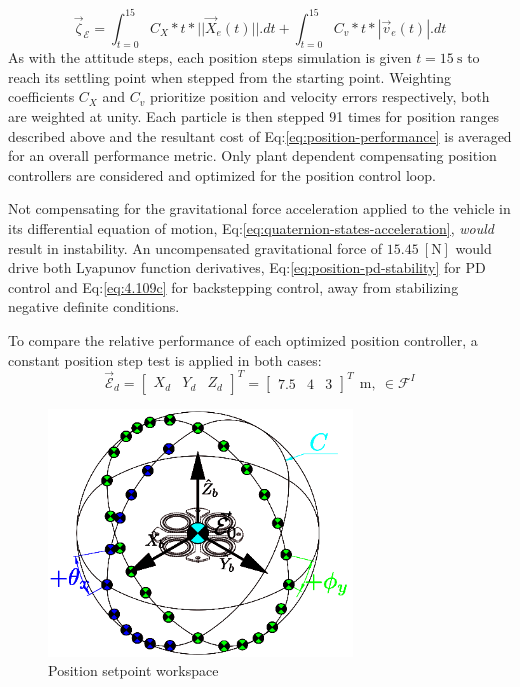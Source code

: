 \begin{equation}\label{eq:position-performance}
\vec{\zeta}_{\mathcal{E}}=\int_{t=0}^{15}C_{X}*t*||\vec{X}_e(t)||.dt+\int_{t=0}^{15}C_{v}*t*|\vec{v}_e(t)|.dt
\end{equation}
As with the attitude steps, each position steps simulation is given $t=15~\text{s}$ to reach its settling point when stepped from the starting point. Weighting coefficients $C_X$ and $C_v$ prioritize position and velocity errors respectively, both are weighted at unity. Each particle is then stepped 91 times for position ranges described above and the resultant cost of Eq:\ref{eq:position-performance} is averaged for an overall performance metric. Only plant dependent compensating position controllers are considered and optimized for the position control loop.
\par
Not compensating for the gravitational force acceleration applied to the vehicle in its differential equation of motion, Eq:\ref{eq:quaternion-states-acceleration}, \emph{would} result in instability. An uncompensated gravitational force of $15.45~[\text{N}]$ would drive both Lyapunov function derivatives, Eq:\ref{eq:position-pd-stability} for PD control and Eq:\ref{eq:4.109c} for backstepping control, away from stabilizing negative definite conditions. 
\par
To compare the relative performance of each optimized position controller, a constant position step test is applied in both cases:
\begin{equation}\label{eq:position-step}
\vec{\mathcal{E}}_d=\begin{bmatrix}
X_d&
Y_d&
Z_d
\end{bmatrix}^T=\begin{bmatrix}
7.5&
4&
3
\end{bmatrix}^T~~\text{m},~\in\mathcal{F}^{I}
\end{equation}
\par
\begin{figure}[htbp]
\vspace{-16pt}
\centering
\includegraphics[width=0.72\textwidth]{figs/position-setpoint}
\vspace{-6pt}
\caption{Position setpoint workspace}
\label{fig:position-setpoint}
\vspace{-16pt}
\end{figure}
